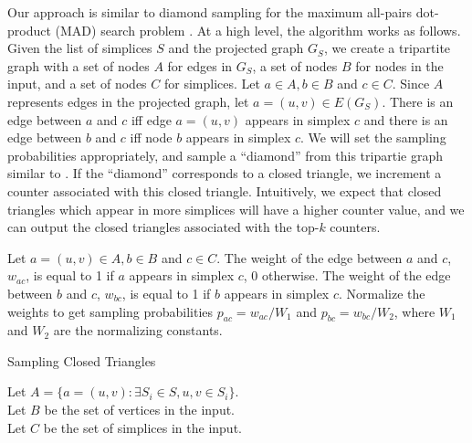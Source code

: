 \documentclass{article}
\begin{document}
Our approach is similar to diamond sampling for
the maximum all-pairs dot-product (MAD) search 
problem \cite{diamond}.
At a high level, the algorithm works as follows. Given the list
of simplices $S$ and the projected graph $G_S$, we create a
tripartite graph with a set of nodes $A$ for edges in $G_S$,
a set of nodes $B$ for nodes in the input, and 
a set of nodes $C$ for simplices.
Let $a \in A, b \in B$ and $c \in C$. Since $A$
represents edges in the projected graph, let $a = (u,v)
\in E(G_S)$. There is an edge between $a$ and $c$ iff
edge $a = (u,v)$ appears in simplex $c$ and there is an
edge between $b$ and $c$ iff node $b$ appears in simplex
$c$. We will set the sampling probabilities appropriately,
and sample a ``diamond'' from this tripartie graph similar to
\cite{diamond}.  
If the ``diamond'' corresponds to a closed triangle,
we increment a counter associated with this closed triangle.
Intuitively, we expect that closed triangles which appear in 
more simplices will have a higher counter value, and we can
output the closed triangles associated with the top-$k$
counters. 

Let $a=(u,v) \in A, b \in B$ and $c \in C$. The weight of the
edge between $a$ and $c$, $w_{ac}$, is equal to 1 if $a$ appears in
simplex $c$, 0 otherwise. The weight of the edge between 
$b$ and $c$, $w_{bc}$, is equal to 1 if $b$ appears in simplex $c$.
Normalize the weights to get sampling probabilities
$p_{ac} = w_{ac}/W_1$ and $p_{bc} = w_{bc}/W_2$,
where $W_1$ and $W_2$ are the normalizing constants.

\begin{algorithm}\label{alg:closedsampling}
  \caption{Sampling Closed Triangles}
  Let $A = \{a = (u,v) : \exists S_i \in S, u,v \in S_i \}$.\\
  Let $B$ be the set of vertices in the input.\\
  Let $C$ be the set of simplices in the input.\\
\end{algorithm}
\end{document}
